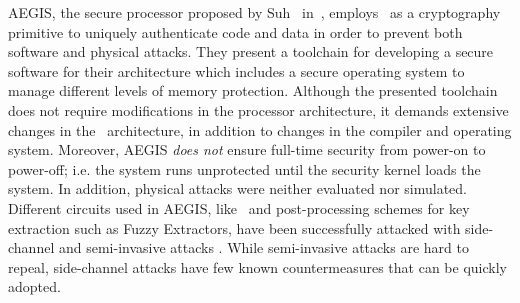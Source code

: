 AEGIS, the secure processor proposed by Suh \etal~in~\cite{Suh2005}, employs \pufs~as a cryptography primitive to uniquely authenticate code and data in order to prevent both software and physical attacks. They present a toolchain for developing a secure software for their architecture which includes a secure operating system to manage different levels of memory protection. Although the presented toolchain does not require modifications in the processor architecture, it demands extensive changes in the \soc~architecture, in addition to changes in the compiler and operating system. Moreover, AEGIS \emph{does not} ensure full-time security from power-on to power-off; i.e. the system runs unprotected until the security kernel loads the system. In addition, physical attacks were neither evaluated nor simulated. Different circuits used in AEGIS, like \pufs~and post-processing schemes for key extraction such as Fuzzy Extractors, have been successfully attacked with side-channel \cite{Merli2011,Tajik2016:Photonic} and semi-invasive attacks \cite{Tajik2015:LaserAttack}. While semi-invasive attacks are hard to repeal, side-channel attacks have few known countermeasures \cite{Merli2013:Masking} that can be quickly adopted.



